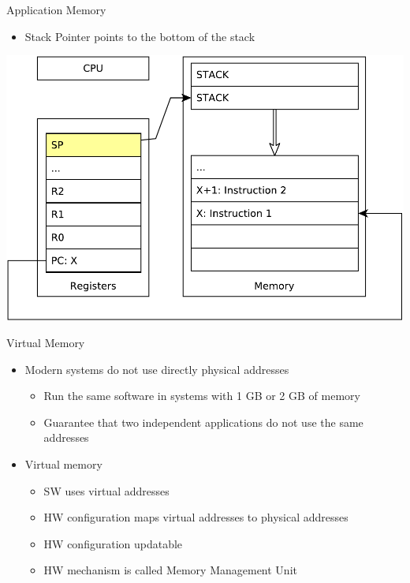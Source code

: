 \documentclass{beamer}
\begin{document}
\begin{frame}[t]{Application Memory}
{{}
     {
  \begin{itemize}
    \item Stack Pointer points to the bottom of the stack
      \\[20pt]
  \end{itemize}
  \includegraphics[width=0.6\linewidth]{stack}
}}
\end{frame}



\begin{frame}{Virtual Memory}
  \begin{itemize}
  \item Modern systems do not use directly physical addresses
    \begin{itemize}
    \item Run the same software in systems with 1 GB or 2 GB of memory
    \item Guarantee that two independent applications do not use the
      same addresses
    \end{itemize}
  \item<2-> Virtual memory
    \begin{itemize}
    \item SW uses virtual addresses
    \item HW configuration maps virtual addresses to physical addresses
    \item HW configuration updatable
    \item HW mechanism is called Memory Management Unit
    \end{itemize}
  \end{itemize}
\end{frame}
\end{document}
